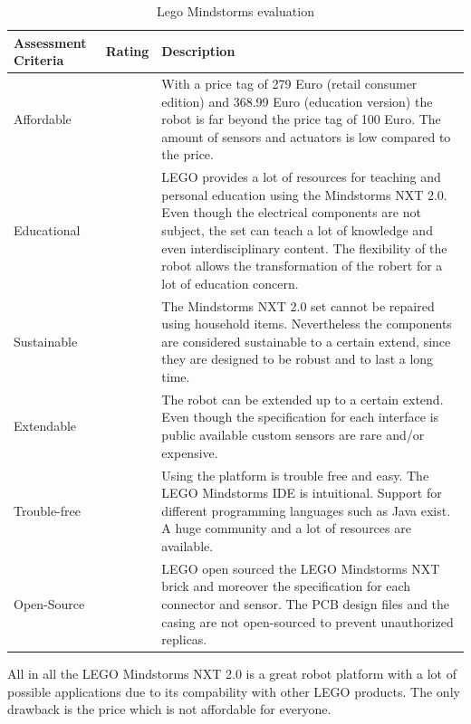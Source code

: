 \documentclass[11pt,a4paper]{article}
\newcounter{starnumber}
\newcommand{\stars}[1]{
  \forloop{starnumber}{1}{\value{starnumber} < 6}{
    \ifthenelse{#1 < \value{starnumber}}{\ding{73}}{\ding{72}}%
  }
}
\begin{document}
\begin{table}[h!]
\centering
\begin{tabular}{p{}p{}p{}}
\toprule
Assessment Criteria    & Rating & Description \\
\midrule
Affordable  & \stars{2}    & With a price tag of 279 Euro (retail consumer edition) and 368.99 Euro (education version) the robot is far beyond the price tag of 100 Euro. The amount of sensors and actuators is low compared to the price.\\
Educational & \stars{5}     & LEGO provides a lot of resources for teaching and personal education using the Mindstorms NXT 2.0. Even though the electrical components are not subject, the set can teach a lot of knowledge and even interdisciplinary content. The flexibility of the robot allows the transformation of the robert for a lot of education concern. \\
Sustainable  & \stars{3}     & The Mindstorms NXT 2.0 set cannot be repaired using household items. Nevertheless the components are considered sustainable to a certain extend, since they are designed to be robust and to last a long time.\\
Extendable & \stars{3} & The robot can be extended up to a certain extend. Even though the specification for each interface is public available custom sensors are rare and/or expensive. \\
Trouble-free & \stars{5} & Using the platform is trouble free and easy. The LEGO Mindstorms IDE is intuitional. Support for different programming languages such as Java exist. A huge community and a lot of resources are available.\\
Open-Source & \stars{4} & LEGO open sourced the LEGO Mindstorms NXT brick and moreover the specification for each connector and sensor. The PCB design files and the casing are not open-sourced to prevent unauthorized replicas.\\
\bottomrule
\end{tabular}
\caption{Lego Mindstorms evaluation}
\label{tbl:mindstorms_eval}
\end{table}

All in all the LEGO Mindstorms NXT 2.0 is a great robot platform with a lot of possible applications due to its compability with other LEGO products. The only drawback is the price which is not affordable for everyone.
\end{document}
